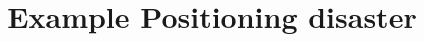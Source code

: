 \documentclass[14pt]{beamer}
\title{Example Positioning disaster}
\begin{document}
\begin{frame}
\titlepage
\end{frame}
\end{document}
